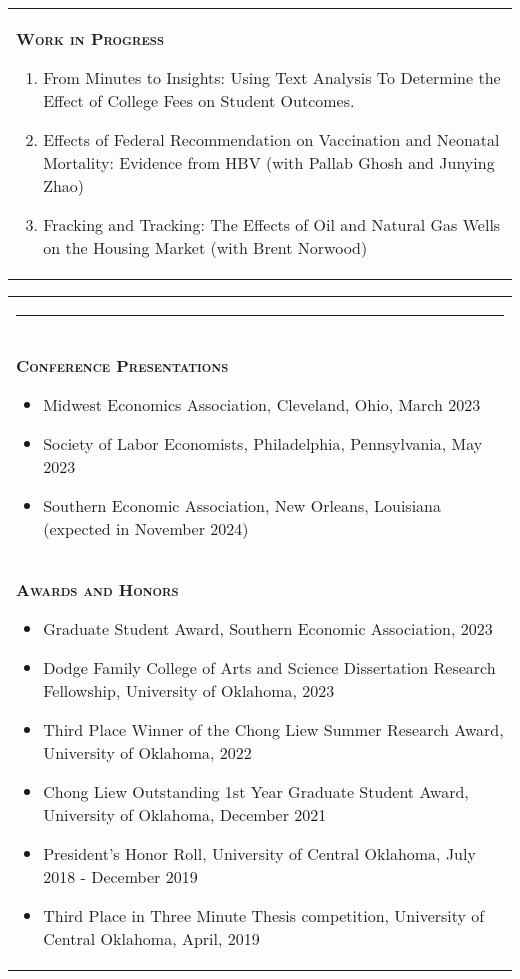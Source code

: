 \documentclass[10pt,letterpaper]{article}
\begin{document}
\begin{tabular}{p{7.5in}}
{\textsc{\textbf{Work in Progress}}}
\begin{enumerate}

\item From Minutes to Insights: Using Text Analysis To Determine the Effect of College Fees on Student Outcomes. 

\item Effects of Federal Recommendation on Vaccination and Neonatal Mortality: Evidence from HBV (with Pallab Ghosh and Junying Zhao)

\item Fracking and Tracking: The Effects of Oil and Natural Gas Wells on the Housing Market (with Brent Norwood)
\end{enumerate}


\end{tabular}



\begin{tabular}{p{7.5in}}
\multicolumn{3}{p{7.5in}}{\hrule}\\[1ex]

	{\large \textsc{\textbf{\large{Conference Presentations}}}}
	\begin{itemize}
    \item Midwest Economics Association,  Cleveland,  Ohio,  March 2023
    \item Society of Labor Economists,  Philadelphia,  Pennsylvania,  May 2023
    \item Southern Economic Association,  New Orleans,  Louisiana (expected in November 2024)
	\end{itemize}
	\\
	
	{\large \textsc{\textbf{\large{Awards and Honors}}}}
	\begin{itemize}

  \item Graduate Student Award, Southern Economic Association,  2023
  
 \item Dodge Family College of Arts and Science Dissertation Research Fellowship, University of Oklahoma,  2023
	\item Third Place Winner of the Chong Liew Summer Research Award, University of Oklahoma, 2022
    \item Chong Liew Outstanding 1st Year Graduate Student Award, University of Oklahoma, December 2021
    \item President's Honor Roll, University of Central Oklahoma, July 2018 - December 2019
    \item Third Place in Three Minute Thesis competition, University of Central Oklahoma, April, 2019
	\end{itemize}

\multicolumn{3}{p{7.5in}}{\hrule}\\[.5ex]
\end{tabular}
\end{document}
